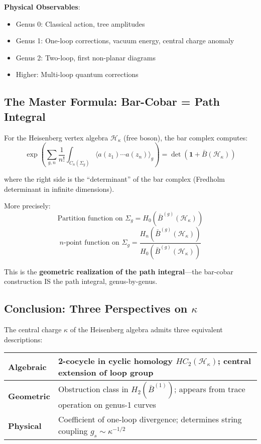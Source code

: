 \textbf{Physical Observables}:
\begin{itemize}
\item Genus 0: Classical action, tree amplitudes
\item Genus 1: One-loop corrections, vacuum energy, central charge anomaly
\item Genus 2: Two-loop, first non-planar diagrams
\item Higher: Multi-loop quantum corrections
\end{itemize}

\subsection{The Master Formula: Bar-Cobar = Path Integral}

\begin{theorem}
For the Heisenberg vertex algebra $\mathcal{H}_\kappa$ (free boson), the bar complex computes:
\begin{equation}
\exp\left( \sum_{g,n} \frac{1}{n!} \int_{C_n(\Sigma_g)} \langle a(z_1) \cdots a(z_n) \rangle_g \right) = \det(\mathbf{1} + \bar{B}(\mathcal{H}_\kappa))
\end{equation}

where the right side is the ``determinant'' of the bar complex (Fredholm determinant in infinite dimensions).

More precisely:
\begin{equation}
\boxed{
\text{Partition function on $\Sigma_g$} = H_0(\bar{B}^{(g)}(\mathcal{H}_\kappa))
}
\end{equation}
\begin{equation}
\boxed{
n\text{-point function on $\Sigma_g$} = \frac{H_n(\bar{B}^{(g)}(\mathcal{H}_\kappa))}{H_0(\bar{B}^{(g)}(\mathcal{H}_\kappa))}
}
\end{equation}
\end{theorem}

This is the \textbf{geometric realization of the path integral}---the bar-cobar construction IS the path integral, genus-by-genus.

\subsection{Conclusion: Three Perspectives on $\kappa$}

The central charge $\kappa$ of the Heisenberg algebra admits three equivalent descriptions:

\begin{center}
\begin{tabular}{|l|p{8cm}|}
\hline
\textbf{Algebraic} & 2-cocycle in cyclic homology $HC_2(\mathcal{H}_\kappa)$; central extension of loop group\\
\hline
\textbf{Geometric} & Obstruction class in $H_2(\bar{B}^{(1)})$; appears from trace operation on genus-1 curves\\
\hline
\textbf{Physical} & Coefficient of one-loop divergence; determines string coupling $g_s \sim \kappa^{-1/2}$\\
\hline
\end{tabular}
\end{center}

